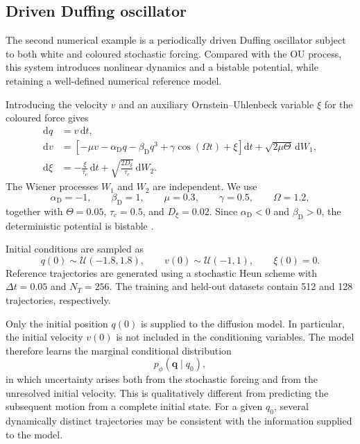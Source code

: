 \subsection{Driven Duffing oscillator}
\label{ssec:duffing}

The second numerical example is a periodically driven Duffing oscillator subject to both white and coloured stochastic forcing. Compared with the OU process, this system introduces nonlinear dynamics and a bistable potential, while retaining a well-defined numerical reference model.

Introducing the velocity $v$ and an auxiliary Ornstein--Uhlenbeck variable $\xi$ for the coloured force gives
\begin{align}
    \mathrm{d}q
    &=
    v\,\mathrm{d}t,
    \label{eq:duffing_q}
    \\
    \mathrm{d}v
    &=
    \left[
        -\mu v
        -\alpha_{\mathrm D}q
        -\beta_{\mathrm D}q^3
        +\gamma\cos(\Omega t)
        +\xi
    \right]\mathrm{d}t
    +
    \sqrt{2\mu\Theta}\,\mathrm{d}W_1,
    \label{eq:duffing_v}
    \\
    \mathrm{d}\xi
    &=
    -\frac{\xi}{\tau_c}\,\mathrm{d}t
    +
    \sqrt{\frac{2D_\xi}{\tau_c}}\,\mathrm{d}W_2.
    \label{eq:duffing_colour}
\end{align}
The Wiener processes $W_1$ and $W_2$ are independent. We use
\begin{equation}
    \alpha_{\mathrm D}=-1,\qquad
    \beta_{\mathrm D}=1,\qquad
    \mu=0.3,\qquad
    \gamma=0.5,\qquad
    \Omega=1.2,
\end{equation}
together with $\Theta=0.05$, $\tau_c=0.5$, and $D_\xi=0.02$. Since $\alpha_{\mathrm D}<0$ and $\beta_{\mathrm D}>0$, the deterministic potential is bistable \cite{guckenheimer1983nonlinear}.

Initial conditions are sampled as
\begin{equation}
    q(0)\sim\mathcal{U}(-1.8,1.8),
    \qquad
    v(0)\sim\mathcal{U}(-1,1),
    \qquad
    \xi(0)=0.
\end{equation}
Reference trajectories are generated using a stochastic Heun scheme with $\Delta t=0.05$ and $N_T=256$. The training and held-out datasets contain 512 and 128 trajectories, respectively.

Only the initial position $q(0)$ is supplied to the diffusion model. In particular, the initial velocity $v(0)$ is not included in the conditioning variables. The model therefore learns the marginal conditional distribution
\begin{equation}
    p_\phi(\mathbf{q}\mid q_0),
\end{equation}
in which uncertainty arises both from the stochastic forcing and from the unresolved initial velocity. This is qualitatively different from predicting the subsequent motion from a complete initial state. For a given $q_0$, several dynamically distinct trajectories may be consistent with the information supplied to the model.

